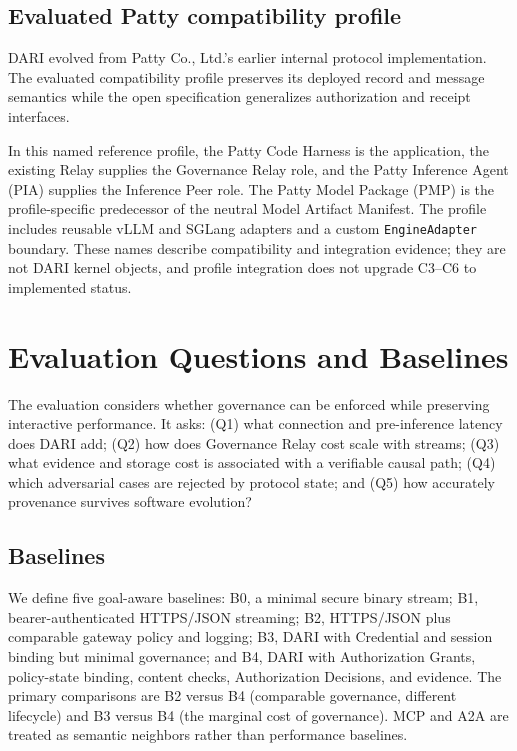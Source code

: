 \documentclass[10pt]{article}
\begin{document}
\subsection{Evaluated Patty compatibility profile}

DARI evolved from Patty Co., Ltd.'s earlier internal protocol implementation. The evaluated compatibility profile preserves its deployed record and message semantics while the open specification generalizes authorization and receipt interfaces.

In this named reference profile, the Patty Code Harness is the application, the existing Relay supplies the Governance Relay role, and the Patty Inference Agent (PIA) supplies the Inference Peer role. The Patty Model Package (PMP) is the profile-specific predecessor of the neutral Model Artifact Manifest. The profile includes reusable vLLM and SGLang adapters and a custom \texttt{EngineAdapter} boundary. These names describe compatibility and integration evidence; they are not DARI kernel objects, and profile integration does not upgrade C3--C6 to implemented status.

\section{Evaluation Questions and Baselines}

The evaluation considers whether governance can be enforced while preserving interactive performance. It asks: (Q1) what connection and pre-inference latency does DARI add; (Q2) how does Governance Relay cost scale with streams; (Q3) what evidence and storage cost is associated with a verifiable causal path; (Q4) which adversarial cases are rejected by protocol state; and (Q5) how accurately provenance survives software evolution?

\subsection{Baselines}

We define five goal-aware baselines: B0, a minimal secure binary stream; B1, bearer-authenticated HTTPS/JSON streaming; B2, HTTPS/JSON plus comparable gateway policy and logging; B3, DARI with Credential and session binding but minimal governance; and B4, DARI with Authorization Grants, policy-state binding, content checks, Authorization Decisions, and evidence. The primary comparisons are B2 versus B4 (comparable governance, different lifecycle) and B3 versus B4 (the marginal cost of governance). MCP and A2A are treated as semantic neighbors rather than performance baselines.
\end{document}
